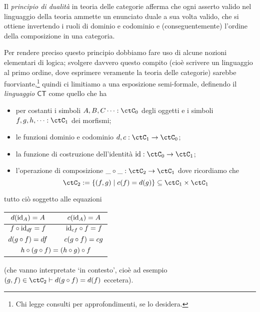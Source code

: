 \begin{proposition}
	Il \emph{principio di dualità} in teoria delle categorie afferma che ogni asserto valido nel linguaggio della teoria ammette un enunciato duale a sua volta valido, che si ottiene invertendo i ruoli di dominio e codominio e (conseguentemente) l'ordine della composizione in una categoria.

	Per rendere preciso questo principio dobbiamo fare uso di alcune nozioni elementari di logica; svolgere davvero questo compito (cioè scrivere un linguaggio al primo ordine, dove esprimere veramente la teoria delle categorie) sarebbe fuorviante,\footnote{Chi legge consulti \cite{ETCC} per approfondimenti, se lo desidera.} quindi ci limitiamo a una esposizione semi-formale, definendo il \emph{linguaggio \(\mathsf{CT}\)} come quello che ha
	\begin{itemize}
		\item per costanti i simboli \(A,B,C\dots : \ctC_0\) degli oggetti e i simboli \(f,g,h,\dots : \ctC_1\) dei morfismi;
		\item le funzioni dominio e codominio \(d,c : \ctC_1\to\ctC_0\);
		\item la funzione di costruzione dell'identità \(\id : \ctC_0\to \ctC_1\);
		\item l'operazione di composizione \(\_\cmp\_ : \ctC_2 \to \ctC_1\) dove ricordiamo che
		      \[\ctC_2 := \{(f,g)\mid c(f) = d(g)\}\subseteq\ctC_1\times\ctC_1\]
	\end{itemize}
	tutto ciò soggetto alle equazioni
		\begin{center}
			\begin{tabular}{ccc}
        $d(\mathrm{id}_A)=A$                      && $c(\mathrm{id}_A)=A$       \\\midrule
        $f\circ \mathrm{id}_{df}=f$                && $\mathrm{id}_{cf}\circ f=f$ \\\midrule
        $d(g\circ f)=df$                   && $c(g\circ f)=cg$    \\\midrule
			\multicolumn{3}{c}{$h\circ (g\circ f)=(h\circ g)\circ f$}
			\end{tabular}
		\end{center}
	(che vanno interpretate `in contesto', cioè ad esempio \((g,f) \in \ctC_2\vdash d(g\cmp f)=d(f)\) eccetera).


\end{proposition}
